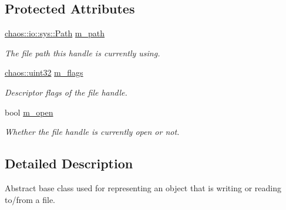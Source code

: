 \subsection*{Protected Attributes}
\begin{DoxyCompactItemize}
\item 
\hypertarget{classchaos_1_1io_1_1sys_1_1_file_handle_a8e6a9c9ab7d7abec8fc2bbcf595cfba1}{}\hyperlink{classchaos_1_1io_1_1sys_1_1_path}{chaos\+::io\+::sys\+::\+Path} \hyperlink{classchaos_1_1io_1_1sys_1_1_file_handle_a8e6a9c9ab7d7abec8fc2bbcf595cfba1}{m\+\_\+path}\label{classchaos_1_1io_1_1sys_1_1_file_handle_a8e6a9c9ab7d7abec8fc2bbcf595cfba1}

\begin{DoxyCompactList}\small\item\em The file path this handle is currently using. \end{DoxyCompactList}\item 
\hypertarget{classchaos_1_1io_1_1sys_1_1_file_handle_aa6a2c99d5e0b94ed1d9c4b511352f78a}{}\hyperlink{namespacechaos_a8641b3ae4551f0b35570d4f9f4ec22d9}{chaos\+::uint32} \hyperlink{classchaos_1_1io_1_1sys_1_1_file_handle_aa6a2c99d5e0b94ed1d9c4b511352f78a}{m\+\_\+flags}\label{classchaos_1_1io_1_1sys_1_1_file_handle_aa6a2c99d5e0b94ed1d9c4b511352f78a}

\begin{DoxyCompactList}\small\item\em Descriptor flags of the file handle. \end{DoxyCompactList}\item 
\hypertarget{classchaos_1_1io_1_1sys_1_1_file_handle_a4047ce2fadb3410ce99b5869da16007d}{}bool \hyperlink{classchaos_1_1io_1_1sys_1_1_file_handle_a4047ce2fadb3410ce99b5869da16007d}{m\+\_\+open}\label{classchaos_1_1io_1_1sys_1_1_file_handle_a4047ce2fadb3410ce99b5869da16007d}

\begin{DoxyCompactList}\small\item\em Whether the file handle is currently open or not. \end{DoxyCompactList}\end{DoxyCompactItemize}


\subsection{Detailed Description}
Abstract base class used for representing an object that is writing or reading to/from a file. 

